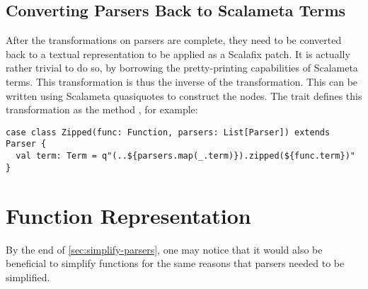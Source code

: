 \documentclass[../../main.tex]{subfiles}
\begin{document}
\subsection{Converting Parsers Back to Scalameta Terms}
After the transformations on parsers are complete, they need to be converted back to a textual representation to be applied as a Scalafix patch.
It is actually rather trivial to do so, by borrowing the pretty-printing capabilities of Scalameta terms.
This transformation is thus the inverse of the  transformation.
This can be written using Scalameta quasiquotes to construct the  nodes.
The  trait defines this transformation as the method , for example:
\begin{verbatim}
case class Zipped(func: Function, parsers: List[Parser]) extends Parser {
  val term: Term = q"(..${parsers.map(_.term)}).zipped(${func.term})"
}
\end{verbatim}

\section{Function Representation}\label{sec:function-representation}
By the end of \cref{sec:simplify-parsers}, one may notice that it would also be beneficial to simplify functions for the same reasons that parsers needed to be simplified.
\end{document}
